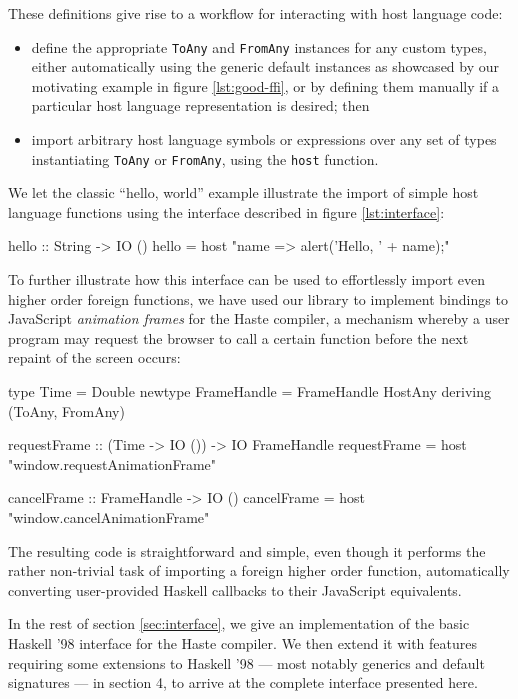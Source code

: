 \documentclass[preprint]{sigplanconf}
\begin{document}
These definitions give rise to a workflow for interacting with host
language code:
\begin{itemize}
\item
  define the appropriate \lstinline!ToAny! and \lstinline!FromAny! instances
  for any custom types, either automatically using the generic default instances
  as showcased by our motivating example in figure \ref{lst:good-ffi},
  or by defining them manually if a particular host language representation is
  desired; then
\item
  import arbitrary host language symbols or expressions over
  any set of types instantiating \lstinline!ToAny! or \lstinline!FromAny!,
  using the \lstinline!host! function.
\end{itemize}

We let the classic ``hello, world'' example illustrate the import of simple
host language functions using the interface described in figure
\ref{lst:interface}:

\begin{code}
  hello :: String -> IO ()
  hello = host "name => alert('Hello, ' + name);"
\end{code}

To further illustrate how this interface can be used to effortlessly import
even higher order foreign functions, we have used our library to
implement bindings to JavaScript \emph{animation frames} for the Haste
compiler, a mechanism whereby a user program may request the browser to call
a certain function before the next repaint of the screen occurs:

\begin{code}
  type Time = Double
  newtype FrameHandle = FrameHandle HostAny
    deriving (ToAny, FromAny)

  requestFrame :: (Time -> IO ()) -> IO FrameHandle
  requestFrame = host "window.requestAnimationFrame"

  cancelFrame :: FrameHandle -> IO ()
  cancelFrame = host "window.cancelAnimationFrame"
\end{code}

The resulting code is straightforward and simple, even though it performs
the rather non-trivial task of importing a foreign higher order function,
automatically converting user-provided Haskell callbacks to their JavaScript
equivalents.

In the rest of section \ref{sec:interface}, we give an implementation of the
basic Haskell '98 interface for the Haste compiler.
We then extend it with features requiring some extensions to Haskell '98 ---
most notably generics and default signatures --- in section 4, to arrive at the
complete interface presented here.
\end{document}

